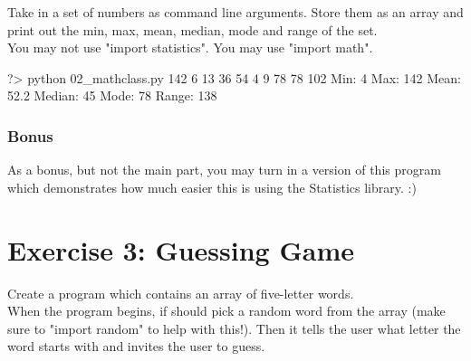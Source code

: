 \documentclass{42-en}
\begin{document}
Take in a set of numbers as command line arguments. Store them as an array and print out the min, max, mean, median, mode and range of the set.\\

You may not use "import statistics". You may use "import math".

\begin{42console}
	?> python 02_mathclass.py 142 6 13 36 54 4 9 78 78 102
	Min: 4
	Max: 142
	Mean: 52.2
	Median: 45
	Mode: 78
	Range: 138
\end{42console}


\subsection{Bonus}

As a bonus, but not the main part, you may turn in a version of this program which demonstrates how much easier this is using the Statistics library. :)

\nextexercice
\newpage


\chapter{Exercise 3: Guessing Game}
\makeheaderfiles

Create a program which contains an array of five-letter words.\\
When the program begins, if should pick a random word from the array (make sure to "import random" to help with this!). Then it tells the user what letter the word starts with and invites the user to guess.\\
\end{document}
